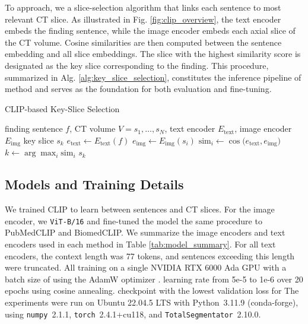 \documentclass[bioengineering,article,submit,pdftex,moreauthors]{Definitions/mdpi}
\begin{document}
  To   approach, we  a slice-selection algorithm that links each  sentence to  most relevant CT slice. 
  As illustrated in Fig. \ref{fig:clip_overview}, the text encoder embeds the finding sentence, while the image encoder embeds each axial slice of the CT volume. 
  Cosine similarities are then computed between the sentence embedding and all slice embeddings. 
  The slice with the highest similarity score is designated as the key slice corresponding to the finding. 
  This procedure, summarized in Alg. \ref{alg:key_slice_selection}, constitutes the inference pipeline of  method and serves as the foundation for both evaluation and fine-tuning.



\begin{algorithm}
  \caption{CLIP-based Key-Slice Selection}
  \label{alg:key_slice_selection}
  \begin{algorithmic}[1]
    \REQUIRE finding sentence $f$, CT volume $V = {s_1, \dots, s_N}$, text encoder $E_{\mathrm{text}}$, image encoder $E_{\mathrm{img}}$
    \ENSURE key slice $s_k$
    \STATE $e_{\mathrm{text}} \leftarrow E_{\mathrm{text}}(f)$ 
      \STATE $e_{\mathrm{img}} \leftarrow E_{\mathrm{img}}(s_i)$ 
      \STATE $\mathrm{sim}_i \leftarrow \cos\bigl(e_{\mathrm{text}}, e_{\mathrm{img}}\bigr)$ 
    \ENDFOR
    \STATE $k \leftarrow \arg\max_i \mathrm{sim}_i$ 
    \RETURN $s_k$
  \end{algorithmic}
\end{algorithm}


\subsection{Models and Training Details}
We trained CLIP to learn  between  sentences and CT slices. 
For the image encoder, we  \texttt{ViT-B/16} and fine-tuned the  model  the same procedure to PubMedCLIP and BiomedCLIP. We summarize the image encoders and text encoders used in each method in Table \ref{tab:model_summary}.
For all text encoders, the context length was   77 tokens, and sentences exceeding this length were truncated.
All training   on a single NVIDIA RTX 6000 Ada GPU with a batch size of  using the AdamW optimizer \cite{loshchilov_fixing_2017}. 
 learning rate from 5e-5 to 1e-6 over 20 epochs using cosine annealing. 
 checkpoint with the lowest validation loss for 
The experiments were run on Ubuntu 22.04.5 LTS with Python~3.11.9 (conda-forge), using \texttt{numpy}~2.1.1, \texttt{torch}~2.4.1+cu118, and \texttt{TotalSegmentator}~2.10.0.
\end{document}
